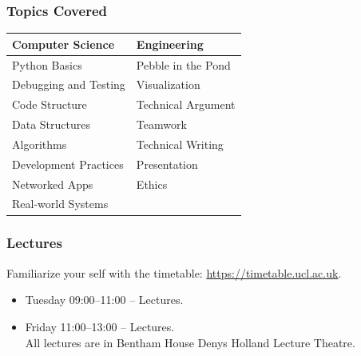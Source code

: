 \documentclass{beamer} %
\begin{document}
\begin{frame}
\frametitle{Topics Covered} 

\begin{center}
\begin{tabular}{ l l }
  \hline
  Computer Science & Engineering \\
  \hline
  Python Basics & Pebble in the Pond\\
  Debugging and Testing & Visualization\\
  Code Structure & Technical Argument\\
  Data Structures & Teamwork \\
  Algorithms & Technical Writing\\
  Development Practices & Presentation\\
  Networked Apps & Ethics\\
  Real-world Systems\\
  \hline
\end{tabular}
\end{center}

\end{frame}

\begin{frame}
\frametitle{Lectures} 

Familiarize your self with the timetable: \url{https://timetable.ucl.ac.uk}.

\begin{itemize}
\item Tuesday 09:00--11:00 -- Lectures.\\
\item Friday 11:00--13:00 -- Lectures.\\
All lectures are in Bentham House Denys Holland Lecture Theatre.
\end{itemize}
\end{frame}
\end{document}
